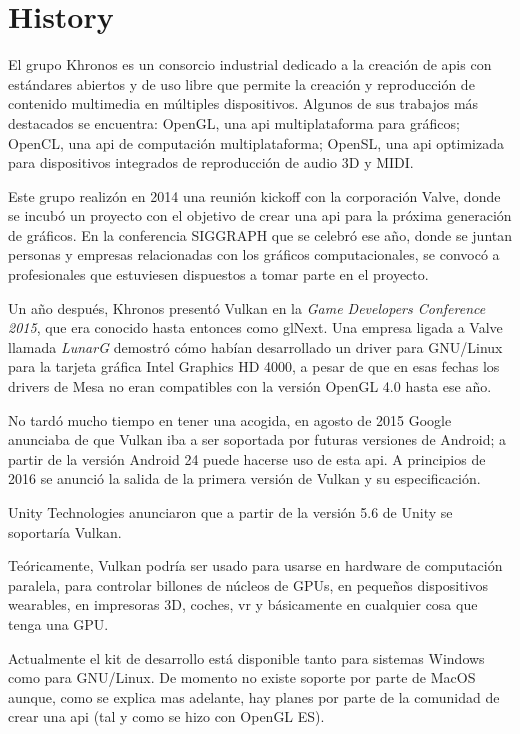 \chapter{History}
El grupo Khronos es un consorcio industrial dedicado a la creación de \gls{api}s con estándares abiertos y de uso libre
que permite la creación y reproducción de contenido multimedia en múltiples dispositivos. Algunos de sus trabajos más
destacados se encuentra: OpenGL, una \gls{api} multiplataforma para gráficos; OpenCL, una \gls{api} de computación
multiplataforma; OpenSL, una \gls{api} optimizada para dispositivos integrados de reproducción de audio 3D y MIDI.

Este grupo realizón en 2014 una reunión kickoff con la corporación Valve, donde se incubó un proyecto con el objetivo
de crear una \gls{api} para la próxima generación de gráficos. En la conferencia SIGGRAPH que se celebró ese año, donde
se juntan personas y empresas relacionadas con los gráficos computacionales, se convocó a profesionales que estuviesen
dispuestos a tomar parte en el proyecto.

Un año después, Khronos presentó Vulkan en la \emph{Game Developers Conference 2015}, que era conocido hasta entonces
como glNext. Una empresa ligada a Valve llamada \emph{LunarG} demostró cómo habían desarrollado un driver para GNU/Linux
para la tarjeta gráfica Intel Graphics HD 4000, a pesar de que en esas fechas los drivers de Mesa no eran compatibles
con la versión OpenGL 4.0 hasta ese año.

No tardó mucho tiempo en tener una acogida, en agosto de 2015 Google anunciaba de que Vulkan iba a ser soportada por
futuras versiones de Android; a partir de la versión Android 24 puede hacerse uso de esta \gls{api}. A principios de
2016 se anunció la salida de la primera versión de Vulkan y su especificación.

Unity Technologies anunciaron que a partir de la versión 5.6 de Unity se soportaría Vulkan.

Teóricamente, Vulkan podría ser usado para usarse en hardware de computación paralela, para controlar billones de
núcleos de GPUs, en pequeños dispositivos wearables, en impresoras 3D, coches, \gls{vr} y básicamente en cualquier
cosa que tenga una GPU.

Actualmente el kit de desarrollo está disponible tanto para sistemas Windows como para GNU/Linux. De momento no existe
soporte por parte de MacOS aunque, como se explica mas adelante, hay planes por parte de la comunidad de crear una
\gls{api} (tal y como se hizo con OpenGL ES).
